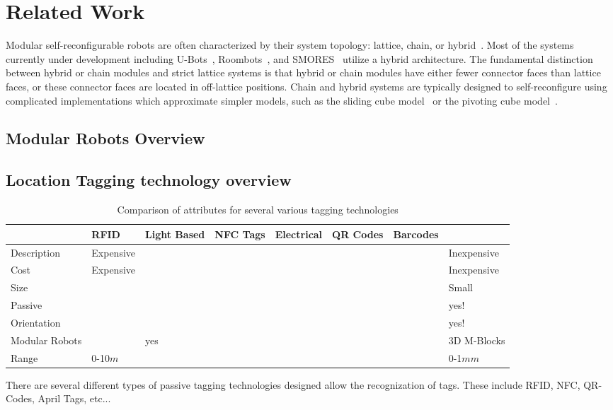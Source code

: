 \section{Related Work}
\label{sec:RelatedWork}

Modular self-reconfigurable robots are often characterized by their
system topology: lattice, chain, or hybrid~\cite{Yim-RAM07}.  Most of
the systems currently under development including U-Bots~\cite{ubot},
Roombots~\cite{roombots3}, and SMORES~\cite{Yim-RAM07} utilize a hybrid
architecture. The fundamental distinction between hybrid or chain modules and
strict lattice systems is that hybrid or chain modules have either fewer
connector faces than lattice faces, or these connector faces are
located in off-lattice positions.  Chain and hybrid
systems are typically designed to self-reconfigure using complicated
implementations which approximate simpler models, such as the sliding cube model~\cite{FitchRus-IROS03} or
the pivoting cube model~\cite{RomanishinRus-IROS13}.

\subsection{Modular Robots Overview}

\subsection{Location Tagging technology overview}

\begin{table*}[ht]
	\centering
	\caption{Comparison of attributes for several various tagging technologies}
	\newcommand{\wdd}{1.8cm}
	\begin{tabular}{ p{\wdd} |p{\wdd}  p{\wdd} p{\wdd} p{\wdd} p{\wdd} p{\wdd} p{\wdd}  }
		\hline
		& RFID 				%
		& Light Based		%
		& NFC Tags 			%
		& Electrical 		%
		& QR Codes 			%
		& Barcodes			%
		& \tagNamePlural \\ %
		\hline
		Description		& Expensive	& 			& 		& 		& 		& 	  	& Inexpensive \\
		Cost			& Expensive	& 			& 		& 		& 		& 	  	& Inexpensive \\
		Size 			&  			& 			&    	&   	&       &     	& Small		  \\
		Passive 		&  			&			&  		&	 	&		& 		& yes!		  \\
		Orientation 	&  			& 			&  		&	 	&	  	& 		& yes!		\\
		Modular Robots 	&  			& yes		&	  	&		&		& 		& 3D M-Blocks\\
		Range			& 0-10$m$	&			&		&		&		&		& 0-1$mm$	\\
	\end{tabular}
	\label{tab:tagTech}    
\end{table*}

There are several different types of passive tagging technologies designed allow the recognization of tags. These include RFID, NFC, QR-Codes, April Tags, etc... 


